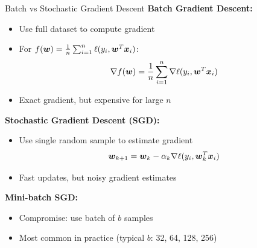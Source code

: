 \documentclass[aspectratio=169]{beamer}
\begin{document}
\begin{frame}[fragile]{Batch vs Stochastic Gradient Descent}
  \textbf{Batch Gradient Descent:}
    \begin{itemize}
      \item Use full dataset to compute gradient
      \item For $f(\boldsymbol{w}) = \frac{1}{n}\sum_{i=1}^n \ell(y_i, \boldsymbol{w}^T\boldsymbol{x}_i)$:
      $$\nabla f(\boldsymbol{w}) = \frac{1}{n}\sum_{i=1}^n \nabla \ell(y_i, \boldsymbol{w}^T\boldsymbol{x}_i)$$
      \item Exact gradient, but expensive for large $n$
    \end{itemize}

  \vspace{0.5em}

  \textbf{Stochastic Gradient Descent (SGD):}
  \begin{itemize}
    \item Use single random sample to estimate gradient
    $$\boldsymbol{w}_{k+1} = \boldsymbol{w}_k - \alpha_k \nabla \ell(y_i, \boldsymbol{w}_k^T\boldsymbol{x}_i)$$
    \item Fast updates, but noisy gradient estimates
  \end{itemize}

  \vspace{0.5em}

  \textbf{Mini-batch SGD:}
  \begin{itemize}
    \item Compromise: use batch of $b$ samples
    \item Most common in practice (typical $b$: 32, 64, 128, 256)
  \end{itemize}
\end{frame}
\end{document}
